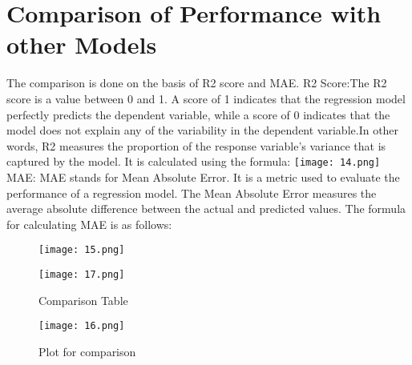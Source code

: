\documentclass[
11pt, %
english, %
singlespacing, %
headsepline, %
]{MastersDoctoralThesis} %
\begin{document}
\chapter{Comparison of Performance with other Models}
\begin{justify}

The comparison is done on the basis of R2 score and MAE.
\break
R2 Score:The R2 score is a value between 0 and 1. A score of 1 indicates that the regression model perfectly predicts the dependent variable, while a score of 0 indicates that the model does not explain any of the variability in the dependent variable.In other words, R2 measures the proportion of the response variable's variance that is captured by the model. It is calculated using the formula:\break\break
    \hspace*{0cm} 
        \texttt{[image: 14.png]}
\break\break\break
MAE: MAE stands for Mean Absolute Error. It is a metric used to evaluate the performance of a regression model. The Mean Absolute Error measures the average absolute difference between the actual and predicted values. The formula for calculating MAE is as follows:\hfill\break
\begin{figure}
    \centering
    \texttt{[image: 15.png]}
\end{figure}
\end{justify}
\break
\begin{figure}
    \centering
    \texttt{[image: 17.png]}
    \caption{Comparison Table}
    \label{fig:enter-label}
\end{figure}
\begin{figure}
    \centering
    \texttt{[image: 16.png]}
    \caption{Plot for comparison}
    \label{fig:enter-label}
\end{figure}
\end{document}
